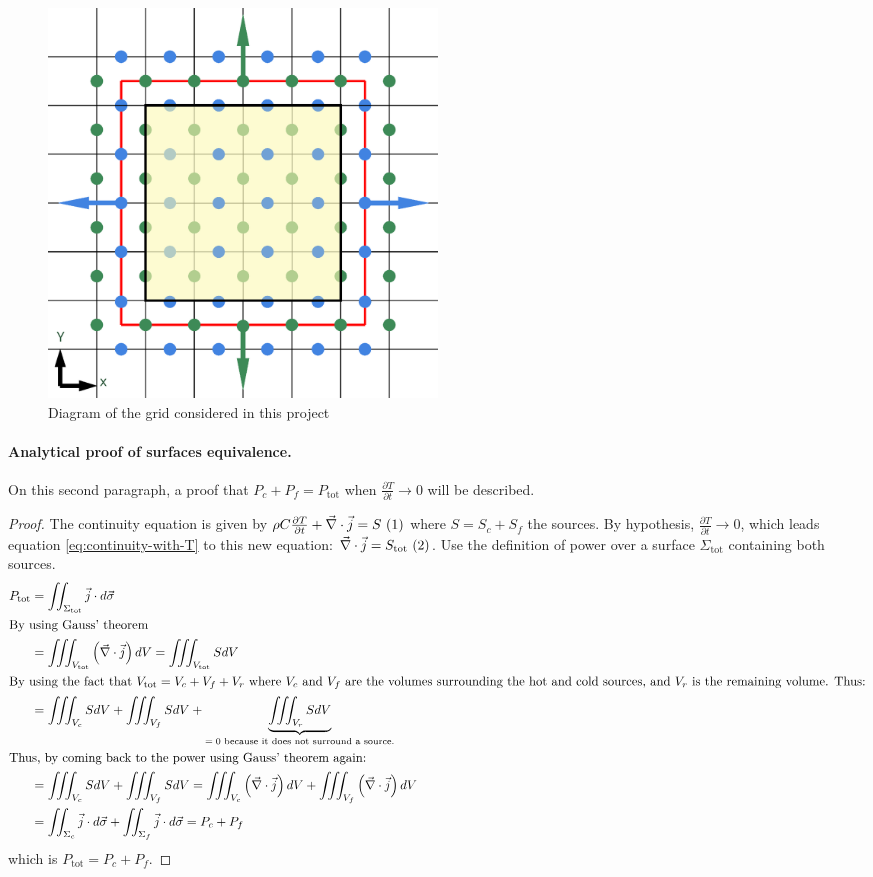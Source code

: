 \documentclass[a4paper,12pt,twoside]{article}
\newcommand{\illabel}[1]{ ~ \refstepcounter{equation}(\theequation)\label{#1}} %
\begin{document}
\begin{figure}[h]
  \centering
  \includegraphics[width=0.5\textwidth]{graphs/d_mailles.eps}
  \caption{Diagram of the grid considered in this project}
  \label{fig:d-mailles}
\end{figure}

\paragraph{Analytical proof of surfaces equivalence.}
On this second paragraph, a proof that $P_c + P_f = P_\text{tot}$ when $\frac{\partial T}{\partial t}\rightarrow 0$ will be described.

\begin{proof}
  The continuity equation is given by $\rho C\frac{\partial T}{\partial t} + \vec{\nabla}\cdot\vec{j} = S \illabel{eq:continuity-with-T}$ where $S = S_c + S_f$ the sources.
  By hypothesis, $\frac{\partial T}{\partial t}\rightarrow 0$, which leads equation \eqref{eq:continuity-with-T} to this new equation: $\vec{\nabla}\cdot\vec{j} = S_\text{tot} \illabel{eq:continuity-without-T}$.
  Use the definition of power over a surface $\Sigma_\text{tot}$ containing both sources.
  \begin{align}
    P_\text{tot} &= \iint_{\Sigma_\text{tot}}\vec{j}\cdot d\vec{\sigma} \\
    \intertext{By using Gauss' theorem}
    &= \iiint_{V_\text{tot}}\left(\vec{\nabla}\cdot\vec{j}\right)dV  = \iiint_{V_\text{tot}}SdV \\
    \intertext{By using the fact that $V_\text{tot} = V_c + V_f + V_r$ where $V_c$ and $V_f$ are the volumes surrounding the hot and cold sources, and $V_r$ is the remaining volume. Thus:}
    &= \iiint_{V_c}SdV + \iiint_{V_f}SdV + \underbrace{\iiint_{V_r}SdV}_\text{$=0$ because it does not surround a source.} \\
    \intertext{Thus, by coming back to the power using Gauss' theorem again:}
    &= \iiint_{V_c}SdV + \iiint_{V_f}SdV = \iiint_{V_c}\left(\vec{\nabla}\cdot\vec{j}\right)dV + \iiint_{V_f}\left(\vec{\nabla}\cdot\vec{j}\right)dV \\
    &= \iint_{\Sigma_c}\vec{j}\cdot d\vec{\sigma} + \iint_{\Sigma_f}\vec{j}\cdot d\vec{\sigma} = P_c + P_f
  \end{align}
  which is $P_\text{tot} = P_c + P_f$.
\end{proof}
\end{document}
